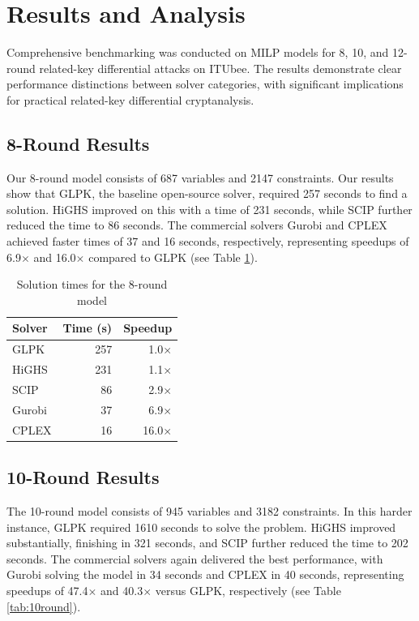 \section{Results and Analysis}

Comprehensive benchmarking was conducted on MILP models for 8, 10, and 12-round related-key differential attacks on ITUbee. The results demonstrate clear performance distinctions between solver categories, with significant implications for practical related-key differential cryptanalysis.

\subsection{8-Round Results}
  Our 8-round model consists of 687 variables and 2147 constraints. Our results show that GLPK, the baseline open-source solver, required 257 seconds to find a solution. HiGHS improved on this with a time of 231 seconds, while SCIP further reduced the time to 86 seconds. The commercial solvers Gurobi and CPLEX achieved faster times of 37 and 16 seconds, respectively, representing speedups of 6.9$\times$ and 16.0$\times$ compared to GLPK (see Table \ref{tab:8round}).
\begin{table}[H]
  \centering
  \caption{Solution times for the 8-round model }
  \label{tab:8round}
  \begin{tabular}{lrr}
    \toprule
    Solver  & Time (s) & Speedup \\
    \midrule
    GLPK   & 257  & 1.0$\times$ \\
    HiGHS  & 231  & 1.1$\times$ \\
    SCIP   & 86   & 2.9$\times$ \\
    Gurobi & 37   & 6.9$\times$ \\
    CPLEX  & 16   & 16.0$\times$ \\
    \bottomrule
  \end{tabular}
\end{table}

\subsection{10-Round Results}

The 10-round model consists of 945 variables and 3182 constraints. In this harder instance, GLPK required 1610 seconds to solve the problem. HiGHS improved substantially, finishing in 321 seconds, and SCIP further reduced the time to 202 seconds. The commercial solvers again delivered the best performance, with Gurobi solving the model in 34 seconds and CPLEX in 40 seconds, representing speedups of 47.4$\times$ and 40.3$\times$ versus GLPK, respectively (see Table \ref{tab:10round}).

